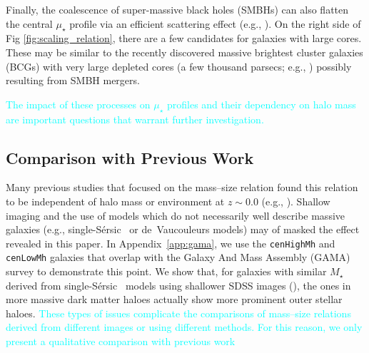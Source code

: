 \documentclass[a4paper,fleqn,usenatbib]{mnras}
\def\ser{{S\'{e}rsic\ }}
\def\rbcg{\texttt{cenHighMh}}
\def\nbcg{\texttt{cenLowMh}}
\def\mstar{{$M_{\star}$}}
\def\mden{{$\mu_{\star}$}}
\newcommand{\song}[1]{\textcolor{cyan}{#1}}
\begin{document}
    Finally, the coalescence of super-massive black holes (SMBHs) can also flatten 
    the central \mden{} profile via an efficient scattering effect 
    (e.g., \citealt{Milosavljevi2002}).
    On the right side of Fig \ref{fig:scaling_relation}, there are a few candidates 
    for galaxies with large cores. 
    These may be similar to the recently discovered massive brightest cluster galaxies 
    (BCGs) with very large depleted cores (a few thousand parsecs; e.g., 
    \citealt{Postman2012, LopezCruz2014, Thomas2016, Bonfini2016}) possibly resulting 
    from SMBH mergers.
    
    \song{
    The impact of these processes on \mden{} profiles and their dependency on 
    halo mass are important questions that warrant further investigation.}


\subsection{Comparison with Previous Work} 

    Many previous studies that focused on the mass--size relation found this relation 
    to be independent of halo mass or environment at $z\sim 0.0$ 
    (e.g., \citealt{Nair2010, Maltby2010, Cappellari2013, HCompany13}). Shallow imaging and the use of models which do not necessarily well describe massive galaxies (e.g., single-\ser{} or de~Vaucouleurs models) may of masked the effect revealed in this paper. In Appendix~\ref{app:gama}, we use the \rbcg{} and \nbcg{} galaxies that overlap 
    with the Galaxy And Mass Assembly (GAMA) survey to demonstrate this point. 
    We show that, for galaxies with similar \mstar{} derived from single-\ser{} 
    models using shallower SDSS images (\citealt{Kelvin2012}), the ones in more 
    massive dark matter haloes actually show more prominent outer stellar haloes.
    \song{These types of issues complicate the comparisons of mass--size relations derived from different images or using different methods. For this reason, we only present a qualitative comparison with previous work}
    
\end{document}
